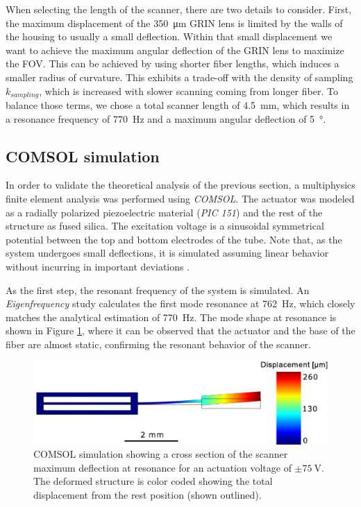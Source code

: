 \documentclass[10pt]{iopart}
\begin{document}
When selecting the length of the scanner, there are two details to consider. First, the maximum displacement of the \SI{350}{\micro\meter} GRIN lens is limited by the walls of the housing to usually a small deflection. Within that small displacement we want to achieve the maximum angular deflection of the GRIN lens to maximize the FOV. This can be achieved by using shorter fiber lengths, which induces a smaller radius of curvature. This exhibits a trade-off with the density of sampling $k_{sampling}$, which is increased with slower scanning coming from longer fiber. To balance those terms, we chose a total scanner length of \SI{4.5}{\milli\meter}, which results in a resonance frequency of \SI{770}{\hertz} and a maximum angular deflection of \SI{5}{\degree}.


\subsection{COMSOL simulation}

In order to validate the theoretical analysis of the previous section, a multiphysics finite element analysis was performed using \textit{COMSOL}. The actuator was modeled as a radially polarized piezoelectric material (\textit{PIC 151}) and the rest of the structure as fused silica. The excitation voltage is a sinusoidal symmetrical potential between the top and bottom electrodes of the tube. Note that, as the system undergoes small deflections, it is simulated assuming linear behavior without incurring in important deviations \cite{Fertis2006}.

As the first step, the resonant frequency of the system is simulated. An \textit{Eigenfrequency} study calculates the first mode resonance at \SI{762}{\hertz}, which closely matches the analytical estimation of \SI{770}{\hertz}. The mode shape at resonance is shown in Figure \ref{fig:defle}, where it can be observed that the actuator and the base of the fiber are almost static, confirming the resonant behavior of the scanner.

\begin{figure}[h!]\centering
      \includegraphics[width=\columnwidth]{figures/deflection.pdf}
      \caption{COMSOL simulation showing a cross section of the scanner maximum deflection at resonance for an actuation voltage of $\pm \SI{75}{\volt}$. The deformed structure is color coded showing the total displacement from the rest position (shown outlined). }
      \label{fig:defle}
\end{figure}
\end{document}
